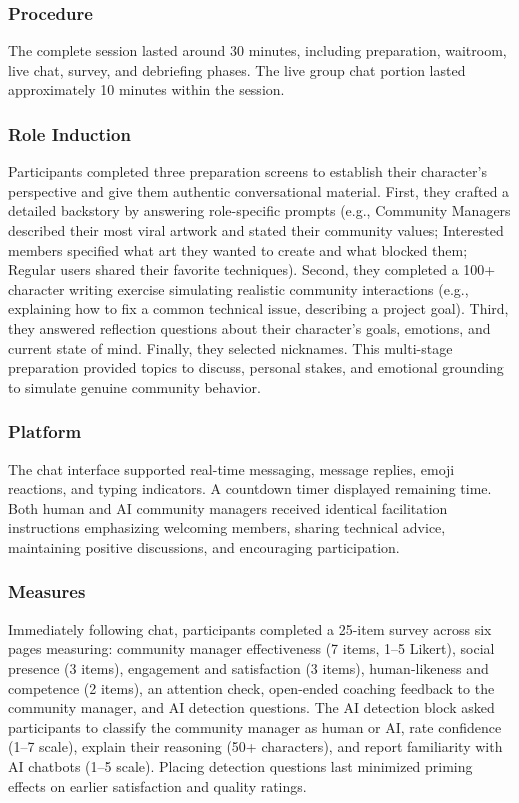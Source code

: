 \documentclass[twocolumn,10pt]{article}
\begin{document}
\subsubsection{Procedure}

The complete session lasted around 30 minutes, including preparation, waitroom, live chat, survey, and debriefing phases. The live group chat portion lasted approximately 10 minutes within the session.

\subsubsection{Role Induction}

Participants completed three preparation screens to establish their character's perspective and give them authentic conversational material. First, they crafted a detailed backstory by answering role-specific prompts (e.g., Community Managers described their most viral artwork and stated their community values; Interested members specified what art they wanted to create and what blocked them; Regular users shared their favorite techniques). Second, they completed a 100+ character writing exercise simulating realistic community interactions (e.g., explaining how to fix a common technical issue, describing a project goal). Third, they answered reflection questions about their character's goals, emotions, and current state of mind. Finally, they selected nicknames. This multi-stage preparation provided topics to discuss, personal stakes, and emotional grounding to simulate genuine community behavior.

\subsubsection{Platform}

The chat interface supported real-time messaging, message replies, emoji reactions, and typing indicators. A countdown timer displayed remaining time. Both human and AI community managers received identical facilitation instructions emphasizing welcoming members, sharing technical advice, maintaining positive discussions, and encouraging participation.

\subsubsection{Measures}

Immediately following chat, participants completed a 25-item survey across six pages measuring: community manager effectiveness (7 items, 1–5 Likert), social presence (3 items), engagement and satisfaction (3 items), human-likeness and competence (2 items), an attention check, open-ended coaching feedback to the community manager, and AI detection questions. The AI detection block asked participants to classify the community manager as human or AI, rate confidence (1–7 scale), explain their reasoning (50+ characters), and report familiarity with AI chatbots (1–5 scale). Placing detection questions last minimized priming effects on earlier satisfaction and quality ratings.
\end{document}
